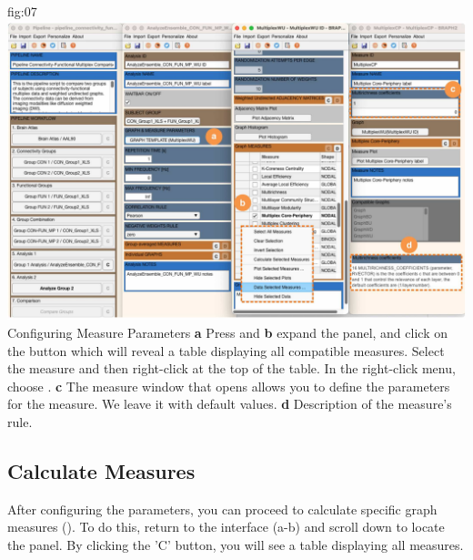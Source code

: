 \documentclass[justified]{tufte-handout}
\begin{document}
	{fig:07}
	{
	\includegraphics{fig07.jpg}
	}
	{Configuring Measure Parameters}
	{
        {\bf a} Press  and
	{\bf b} expand the  panel, and click on the  button which will reveal a table displaying all compatible measures. 
	Select the  measure and then right-click at the top of the table. In the right-click menu, choose .
	{\bf c} The measure window that opens allows you to define the parameters for the  measure. We leave it with default values.
    {\bf d} Description of the  measure's rule.
	}

\clearpage
\subsection{Calculate Measures}
 
After configuring the parameters, you can proceed to calculate specific graph measures (). To do this, return to the  interface (a-b) and scroll down to locate the  panel. By clicking the 'C' button, you will see a table displaying all measures.
\end{document}
